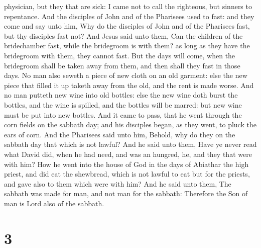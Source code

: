 physician, but they that are sick: I came not to call the righteous, but
sinners to repentance.  And the disciples of John and of
the Pharisees used to fast: and they come and say unto him, Why do the
disciples of John and of the Pharisees fast, but thy disciples fast not?
 And Jesus said unto them, Can the children of the
bridechamber fast, while the bridegroom is with them? as long as they
have the bridegroom with them, they cannot fast.  But the
days will come, when the bridegroom shall be taken away from them, and
then shall they fast in those days.  No man also seweth a
piece of new cloth on an old garment: else the new piece that filled it
up taketh away from the old, and the rent is made worse. 
And no man putteth new wine into old bottles: else the new wine doth
burst the bottles, and the wine is spilled, and the bottles will be
marred: but new wine must be put into new bottles.  And
it came to pass, that he went through the corn fields on the sabbath
day; and his disciples began, as they went, to pluck the ears of corn.
 And the Pharisees said unto him, Behold, why do they on
the sabbath day that which is not lawful?  And he said
unto them, Have ye never read what David did, when he had need, and was
an hungred, he, and they that were with him?  How he went
into the house of God in the days of Abiathar the high priest, and did
eat the shewbread, which is not lawful to eat but for the priests, and
gave also to them which were with him?  And he said unto
them, The sabbath was made for man, and not man for the sabbath:
 Therefore the Son of man is Lord also of the sabbath.

\hypertarget{section-2}{%
\section{3}\label{section-2}}

